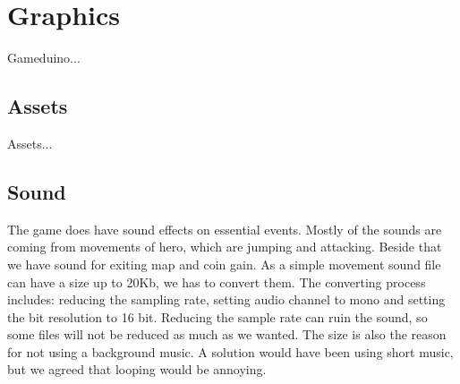 \section{Graphics}
Gameduino...

\subsection{Assets}
Assets...

\subsection{Sound} %
The game does have sound effects on essential events. Mostly of the sounds are coming from movements of hero, which are jumping and attacking. Beside that we have sound for exiting map and coin gain. As a simple movement sound file can have a size up to 20Kb, we has to convert them. The converting process includes: reducing the sampling rate, setting audio channel to mono and setting the bit resolution to 16 bit. Reducing the sample rate can ruin the sound, so some files will not be reduced as much as we wanted. The size is also the reason for not using a background music. A solution would have been using short music, but we agreed that looping would be annoying.

